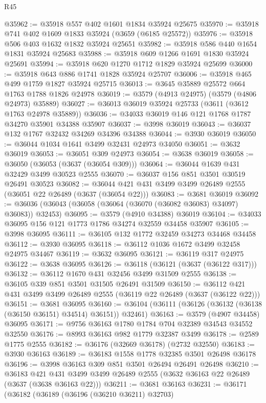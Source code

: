 \begin{lexlean}{R45}
\begin{coremodule}
@35962 := @35918 @557 @402 @1601 @1834 @35924 @25675
@35970 := @35918 @741 @402 @1609 @1833 @35924 (@3659 (@6185 @25572))
@35976 := @35918 @506 @403 @1632 @1832 @35924 @25651
@35982 := @35918 @586 @440 @1654 @1831 @35924 @25683
@35988 := @35918 @609 @1266 @1691 @1830 @35924 @25691
@35994 := @35918 @620 @1270 @1712 @1829 @35924 @25699
@36000 := @35918 @643 @886 @1741 @1828 @35924 @25707
@36006 := @35918 @465 @499 @1759 @1827 @35924 @25715
@36013 := @3645 @35889 @25572 @664 @1763 @1788 @1826 @24978
@36019 := @3579 (@4913 @24975) (@3579 (@4806 @24973) @35889)
@36027 := @36013 @36019 @35924 @25733 (@3611 (@3612 @1763 @24978 @35889))
@36036 := @34033 @36019 @146 @121 @1768 @1787 @34270 @35901 @34388 @35907
@36037 := @3998 @36019
@36043 := @36037 @132 @1767 @32432 @34269 @34396 @34388
@36044 := @3930 @36019
@36050 := @36044 @1034 @1641 @3499 @32431 @24973 @34050
@36051 := @3632 @36019
@36053 := @36051 @309 @24973
@36054 := @3638 @36019
@36058 := @36050 (@36053 (@3637 (@36054 @309)))
@36064 := @36044 @1639 @431 @32429 @3499 @30523 @2555
@36070 := @36037 @156 @851 @3501 @30519 @26491 @30523
@36082 := @36044 @421 @431 @3499 @3499 @26489 @2555 (@36051 @22 @26489 (@3637 (@36054 @22)))
@36083 := @3681 @36019
@36092 := @36036 (@36043 (@36058 (@36064 (@36070 (@36082 @36083) @34097) @36083)) @32453)
@36095 := @3579 (@4910 @34388) @36019
@36104 := @34033 @36095 @156 @121 @1773 @1786 @34274 @32559 @34458 @35907
@36105 := @3998 @36095
@36111 := @36105 @132 @1772 @32459 @34273 @34468 @34458
@36112 := @3930 @36095
@36118 := @36112 @1036 @1672 @3499 @32458 @24975 @34467
@36119 := @3632 @36095
@36121 := @36119 @317 @24975
@36122 := @3638 @36095
@36126 := @36118 (@36121 (@3637 (@36122 @317)))
@36132 := @36112 @1670 @431 @32456 @3499 @31509 @2555
@36138 := @36105 @339 @851 @3501 @31505 @26491 @31509
@36150 := @36112 @421 @431 @3499 @3499 @26489 @2555 (@36119 @22 @26489 (@3637 (@36122 @22)))
@36151 := @3681 @36095
@36160 := @36104 (@36111 (@36126 (@36132 (@36138 (@36150 @36151) @34514) @36151)) @32461)
@36163 := @3579 (@4907 @34458) @36095
@36171 := @9756 @36163 @1780 @1784 @704 @32389 @34543 @34552 @32550
@36176 := @8993 @36163 @982 @1779 @32387 @3499
@36178 := @2589 @1775 @2555
@36182 := @36176 (@32669 @36178) (@2732 @32550)
@36183 := @3930 @36163
@36189 := @36183 @1558 @1778 @32385 @3501 @26498 @36178
@36196 := @3998 @36163 @309 @851 @3501 @26494 @26491 @26498
@36210 := @36183
    @421
    @431
    @3499
    @3499
    @26489
    @2555
    (@3632 @36163 @22 @26489 (@3637 (@3638 @36163 @22)))
@36211 := @3681 @36163
@36231 := @36171
    (@36182
      (@36189
        (@36196 (@36210 @36211) @32703)

\end{coremodule}
\end{lexlean}
